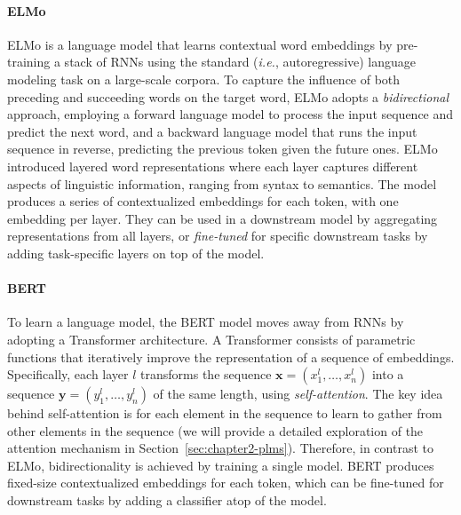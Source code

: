 \paragraph{ELMo} \ac{ELMo} \citep{peters-etal-2018-deep} is a language model that learns contextual word embeddings by pre-training a stack of \acp{RNN} using the standard (\textit{i.e.}, autoregressive) language modeling task on a large-scale corpora. To capture the influence of both preceding and succeeding words on the target word, \ac{ELMo} adopts a \textit{bidirectional} approach, employing a forward language model to process the input sequence and predict the next word, and a backward language model that runs the input sequence in reverse, predicting the previous token given the future ones. \ac{ELMo} introduced layered word representations where each layer captures different aspects of linguistic information, ranging from syntax to semantics. The model produces a series of contextualized embeddings for each token, with one embedding per layer. They can be used in a downstream model by aggregating representations from all layers, or \textit{fine-tuned} for specific downstream tasks by adding task-specific layers on top of the model.

\paragraph{BERT} To learn a language model, the \ac{BERT} model \citep{devlin2018bert} moves away from \acp{RNN} by adopting a Transformer \citep{vaswani2017attention} architecture. A Transformer consists of parametric functions that iteratively improve the representation of a sequence of embeddings. Specifically, each layer $l$ transforms the sequence $\bm{x} = (x^l_1, \ldots, x^l_n)$ into a sequence $\bm{y} = (y^l_1, \ldots, y^l_n)$ of the same length, using \textit{self-attention}. The key idea behind self-attention is for each element in the sequence to learn to gather from other elements in the sequence (we will provide a detailed exploration of the attention mechanism in Section~\ref{sec:chapter2-plms}). Therefore, in contrast to \ac{ELMo}, bidirectionality is achieved by training a single model. \ac{BERT} produces fixed-size contextualized embeddings for each token, which can be fine-tuned for downstream tasks by adding a classifier atop of the model.


